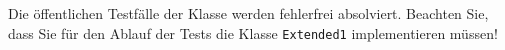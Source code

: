 Die \"offentlichen Testf\"alle der Klasse \texttt{\testLvA}
werden fehlerfrei absolviert. Beachten Sie, dass Sie f\"ur den Ablauf der Tests
die Klasse \texttt{\testAdapter{}Extended1} implementieren m\"ussen!
